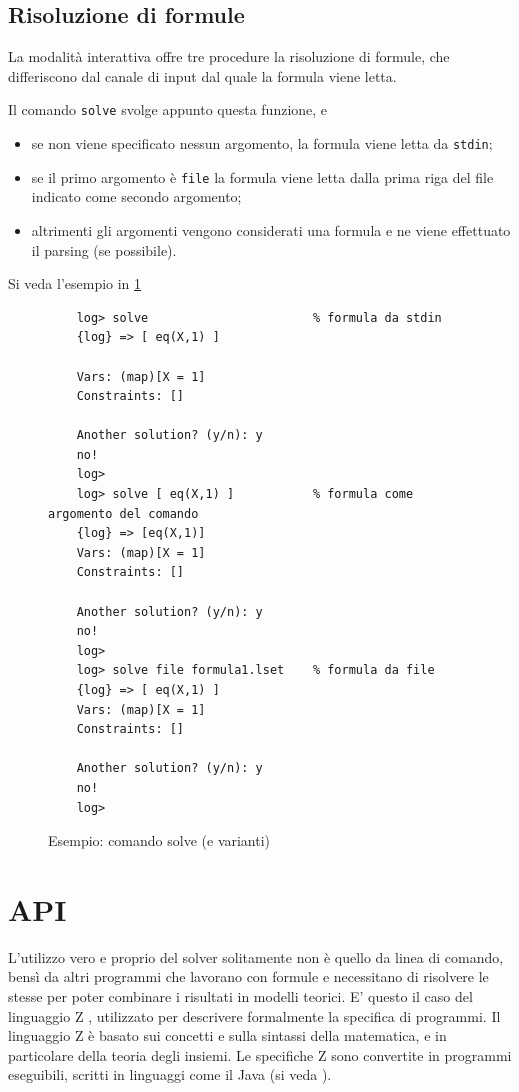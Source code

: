 \documentclass[12pt,a4paper,openright]{book} %
\begin{document}
\subsection{Risoluzione di formule}

La modalità interattiva offre tre procedure la risoluzione di formule, che differiscono dal canale di input dal quale la formula viene letta.

Il comando \texttt{solve} svolge appunto questa funzione, e
\begin{itemize}
	\item se non viene specificato nessun argomento, la formula viene letta da \texttt{stdin};
	\item se il primo argomento è \texttt{file} la formula viene letta dalla prima riga del file indicato come secondo argomento;
	\item altrimenti gli argomenti vengono considerati una formula e ne viene effettuato il parsing (se possibile).
\end{itemize}

Si veda l'esempio in \ref{fig:example_solvecommands}

\begin{figure}
	\begin{verbatim}
	log> solve                       % formula da stdin
	{log} => [ eq(X,1) ]
	
	Vars: (map)[X = 1]
	Constraints: []
	
	Another solution? (y/n): y
	no!
	log>
	log> solve [ eq(X,1) ]           % formula come argomento del comando
	{log} => [eq(X,1)]
	Vars: (map)[X = 1]
	Constraints: []
	
	Another solution? (y/n): y
	no!
	log> 
	log> solve file formula1.lset    % formula da file
	{log} => [ eq(X,1) ]
	Vars: (map)[X = 1]
	Constraints: []
	
	Another solution? (y/n): y
	no!
	log> 
	\end{verbatim}
	\caption{Esempio: comando solve (e varianti)}
	\label{fig:example_solvecommands}
\end{figure}

\section{API}
\label{sec:use_api}

L'utilizzo vero e proprio del solver solitamente non è quello da linea di comando, bensì da altri programmi che lavorano con formule e necessitano di risolvere le stesse per poter combinare i risultati in modelli teorici. E' questo il caso del linguaggio Z \cite{Cristia16}, utilizzato per descrivere formalmente la specifica di programmi. Il linguaggio Z è basato sui concetti e sulla sintassi della matematica, e in particolare della teoria degli insiemi. Le specifiche Z sono convertite in programmi eseguibili, scritti in linguaggi come il Java (si veda \cite{DeSantis17}).
\end{document}
